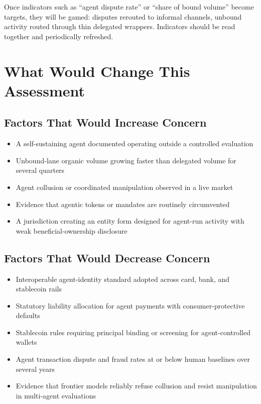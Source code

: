 \documentclass[11pt,letterpaper]{article}
\begin{document}
Once indicators such as ``agent dispute rate'' or ``share of bound volume'' become targets, they will be gamed: disputes rerouted to informal channels, unbound activity routed through thin delegated wrappers. Indicators should be read together and periodically refreshed.

\section{What Would Change This Assessment}

\subsection{Factors That Would Increase Concern}
\begin{itemize}
  \item A self-sustaining agent documented operating outside a controlled evaluation
  \item Unbound-lane organic volume growing faster than delegated volume for several quarters
  \item Agent collusion or coordinated manipulation observed in a live market
  \item Evidence that agentic tokens or mandates are routinely circumvented
  \item A jurisdiction creating an entity form designed for agent-run activity with weak beneficial-ownership disclosure
\end{itemize}

\subsection{Factors That Would Decrease Concern}
\begin{itemize}
  \item Interoperable agent-identity standard adopted across card, bank, and stablecoin rails
  \item Statutory liability allocation for agent payments with consumer-protective defaults
  \item Stablecoin rules requiring principal binding or screening for agent-controlled wallets
  \item Agent transaction dispute and fraud rates at or below human baselines over several years
  \item Evidence that frontier models reliably refuse collusion and resist manipulation in multi-agent evaluations
\end{itemize}
\end{document}
